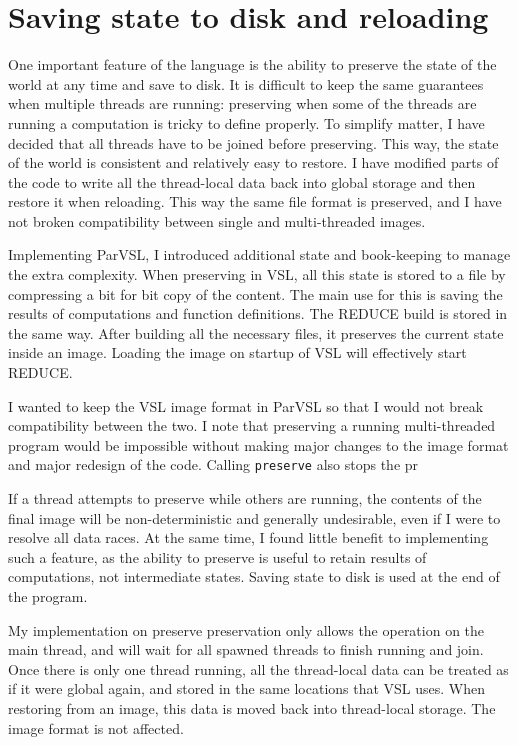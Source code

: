 
\section{Saving state to disk and reloading}
\label{sec:preserve}

One important feature of the language is the ability to preserve the state of the world at any
time and save to disk. It is difficult to keep the same guarantees when multiple threads are running:
preserving when some of the threads are running a computation is tricky to define properly. To simplify
matter, I have decided that all threads have to be joined before preserving. This way, the state of
the world is consistent and relatively easy to restore. I have modified parts of the code to write
all the thread-local data back into global storage and then restore it when reloading. This way the same
file format is preserved, and I have not broken compatibility between single and multi-threaded images.

Implementing ParVSL, I introduced additional state and book-keeping to manage the extra complexity.
When preserving in VSL, all this state is stored to a file by compressing a bit for bit copy of the
content. The main use for this is saving the results of computations and function definitions.
The REDUCE build is stored in the same way. After building all the necessary files,
it preserves the current state inside an image. Loading the image on startup of VSL will effectively
start REDUCE.

I wanted to keep the VSL image format in ParVSL so that I would not break compatibility between the two.
I note that preserving a running multi-threaded program would be impossible without making major changes
to the image format and major redesign of the code. Calling \texttt{preserve} also stops the pr

If a thread attempts to preserve while others
are running, the contents of the final image will be non-deterministic and generally undesirable,
even if I were to resolve all data races. At the same time, I found little benefit to implementing such
a feature, as the ability to preserve is useful to retain results of computations, not intermediate states.
Saving state to disk is used at the end of the program.

My implementation on preserve preservation only allows the operation on the main thread, and will wait
for all spawned threads to finish running and join. Once there is only one thread running, all the
thread-local data can be treated as if it were global again, and stored in the same locations that
VSL uses. When restoring from an image, this data is moved back into thread-local storage. The image
format is not affected.

